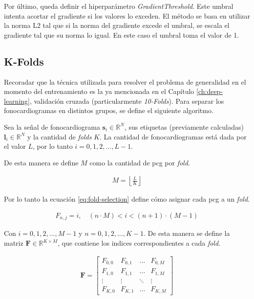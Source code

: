 \indent Por último, queda definir el hiperparámetro \textit{GradientThreshold}. Este umbral intenta acortar el
gradiente si los valores lo exceden. El método se basa en utilizar la norma L2 tal que si la norma del gradiente
excede el umbral, se escala el gradiente tal que su norma lo igual. En este caso el umbral toma el valor de 1.

\subsection{K-Folds} \label{subsec:k-folds}

\indent Recoradar que la técnica utilizada para resolver el problema de generalidad en el momento del entrenamiento
es la ya mencionada en el Capítulo \ref{ch:deep-learning}, validación cruzada (particularmente
\textit{10-Folds}). Para separar los fonocardiogramas en distintos grupos, se define el siguiente algoritmo. \bigskip

\indent Sea la señal de fonocardiograma $\mathbf{s}_i \in \mathbb{R}^N$, sus etiquetas (previamente calculadas)
$\mathbf{l}_i \in \mathbb{R}^N$ y la cantidad de \textit{folds} $K$. La cantidad de fonocardiogramas está dada por
el valor $L$, por lo tanto $i = 0,1,2,\dots,L-1$. \bigskip

\indent De esta manera se define $M$ como la cantidad de \acrshort{pcg} por \textit{fold}.

\begin{align}
  M = \left\lfloor \frac{L}{K} \right\rfloor
\end{align}

\indent Por lo tanto la ecuación \ref{eq:fold-selection} define cómo asignar cada \acrshort{pcg} a un \textit{fold}.

\begin{align} \label{eq:fold-selection}
 F_{n,j} = i, \quad (n \cdot M) < i < (n+1) \cdot (M-1)
\end{align}

\indent Con $i=0,1,2,\dots,M-1$ y $n = 0,1,2,\dots,K-1$. De esta manera se define la matriz $\bm{F} \in
\mathbb{R}^{K \times M}$, que contiene los indices correspondientes a cada \textit{fold}.

\begin{align}
  \bm{F} = \left[\begin{array}{ccccc}
    F_{0,0} & F_{0,1} & \dots & F_{0,M} \\
    F_{1,0} & F_{1,1} & \dots & F_{1,M} \\
    \vdots  & \vdots  & \ddots & \vdots \\
    F_{K,0} & F_{K,1} & \dots & F_{K,M}
  \end{array}\right]
\end{align}

